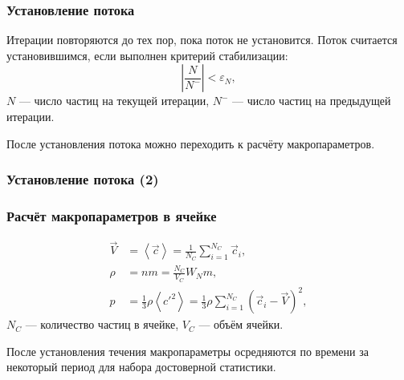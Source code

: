 \documentclass[onlymath]{beamer}
\newcommand{\abs}[1]{\left \lvert{#1}\right \rvert}
\newcommand\avg[1]{\left\langle{#1}\right\rangle}
\renewcommand\epsilon\varepsilon
\newcommand{\statw}{W_N}
\begin{document}
\begin{frame}
  \frametitle{Установление потока}
  Итерации повторяются до тех пор, пока поток не установится.
  Поток считается установившимся, если выполнен критерий
    стабилизации:
    \begin{equation*}
      \abs{\frac{N}{N^-}} < \epsilon_N,
    \end{equation*}
    $N$ — число частиц на текущей итерации, $N^-$ — число частиц на
    предыдущей итерации.

    После установления потока можно переходить к расчёту
    макропараметров.
\end{frame}

\begin{frame}
  \frametitle{Установление потока (2)}
  \begin{figure}[!h]
  \end{figure}
\end{frame}

\begin{frame}
  \frametitle{Расчёт макропараметров в ячейке}
  \begin{equation*}
    \begin{aligned}
        \vec{V} &= \avg{\vec{c}} = 
        \frac{1}{N_C}\sum_{i = 1}^{N_C}{\vec{c}_i},\\
        \rho &= nm = \frac{N_C}{V_C}\statw m,\\
        p &= \frac{1}{3}\rho\avg{c'^2} = 
        \frac{1}{3}\rho\sum_{i=1}^{N_C}(\vec{c}_i - \vec{V})^2,
      \end{aligned}
    \end{equation*}
    $N_C$ — количество частиц в ячейке, $V_C$ — объём ячейки.

    После установления течения макропараметры осредняются по времени
    за некоторый период для набора достоверной статистики.
\end{frame}
\end{document}
